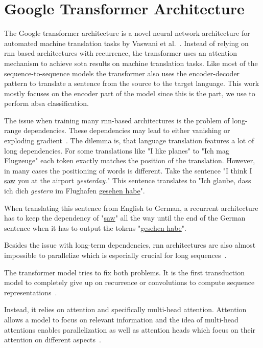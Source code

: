 \section{Google Transformer Architecture}
\label{sec:03_transformer}
The Google transformer architecture is a novel neural network architecture for automated machine translation tasks by Vaswani et al.~\cite{Vaswani2017d}. Instead of relying on \gls{rnn} based architectures with recurrence, the transformer uses an attention mechanism to achieve \gls{sota} results on machine translation tasks. Like most of the sequence-to-sequence models the transformer also uses the encoder-decoder pattern to translate a sentence from the source to the target language. This work mostly focuses on the encoder part of the model since this is the part, we use to perform \gls{absa} classification.
\medskip

The issue when training many \gls{rnn}-based architectures is the problem of long-range dependencies. These dependencies may lead to either vanishing or exploding gradient~\cite{Hochreiter2009}. The dilemma is, that language translation features a lot of long dependencies. For some translations like "I like planes" to "Ich mag Flugzeuge" each token exactly matches the position of the translation. However, in many cases the positioning of words is different. Take the sentence "I think I \underline{saw} you at the airport \emph{yesterday}." This sentence translates to "Ich glaube, dass ich dich \emph{gestern} im Flughafen \underline{gesehen habe}".

When translating this sentence from English to German, a recurrent architecture has to keep the dependency of "\underline{saw}" all the way until the end of the German sentence when it has to output the tokens "\underline{gesehen habe}".
\medskip

Besides the issue with long-term dependencies, \gls{rnn} architectures are also almost impossible to parallelize which is especially crucial for long sequences~\cite{Vaswani2017d}.
\medskip

The transformer model tries to fix both problems. It is the first transduction model to completely give up on recurrence or convolutions to compute sequence representations~\cite{Vaswani2017d}. 

Instead, it relies on attention and specifically multi-head attention. Attention allows a model to focus on relevant information and the idea of multi-head attentions enables parallelization as well as attention heads which focus on their attention on different aspects~\cite{Vaswani2017d}.

